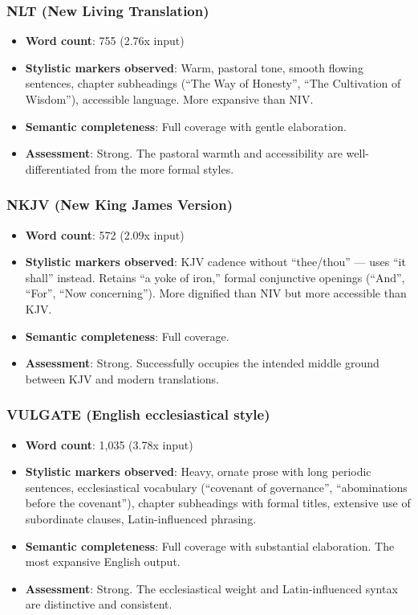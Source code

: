 \documentclass[10pt, letterpaper, twocolumn]{article}
\providecommand{\tightlist}{\setlength{\itemsep}{0pt}\setlength{\parskip}{0pt}}
\begin{document}
\subsubsection*{NLT (New Living Translation)}\label{nlt-new-living-translation}

\begin{itemize}
\tightlist
\item
  \textbf{Word count}: 755 (2.76x input)
\item
  \textbf{Stylistic markers observed}: Warm, pastoral tone, smooth flowing sentences, chapter subheadings (``The Way of Honesty'', ``The Cultivation of Wisdom''), accessible language. More expansive than NIV.
\item
  \textbf{Semantic completeness}: Full coverage with gentle elaboration.
\item
  \textbf{Assessment}: Strong. The pastoral warmth and accessibility are well-differentiated from the more formal styles.
\end{itemize}

\subsubsection*{NKJV (New King James Version)}\label{nkjv-new-king-james-version}

\begin{itemize}
\tightlist
\item
  \textbf{Word count}: 572 (2.09x input)
\item
  \textbf{Stylistic markers observed}: KJV cadence without ``thee/thou'' --- uses ``it shall'' instead. Retains ``a yoke of iron,'' formal conjunctive openings (``And'', ``For'', ``Now concerning''). More dignified than NIV but more accessible than KJV.
\item
  \textbf{Semantic completeness}: Full coverage.
\item
  \textbf{Assessment}: Strong. Successfully occupies the intended middle ground between KJV and modern translations.
\end{itemize}

\subsubsection*{VULGATE (English ecclesiastical style)}\label{vulgate-english-ecclesiastical-style}

\begin{itemize}
\tightlist
\item
  \textbf{Word count}: 1,035 (3.78x input)
\item
  \textbf{Stylistic markers observed}: Heavy, ornate prose with long periodic sentences, ecclesiastical vocabulary (``covenant of governance'', ``abominations before the covenant''), chapter subheadings with formal titles, extensive use of subordinate clauses, Latin-influenced phrasing.
\item
  \textbf{Semantic completeness}: Full coverage with substantial elaboration. The most expansive English output.
\item
  \textbf{Assessment}: Strong. The ecclesiastical weight and Latin-influenced syntax are distinctive and consistent.
\end{itemize}
\end{document}

